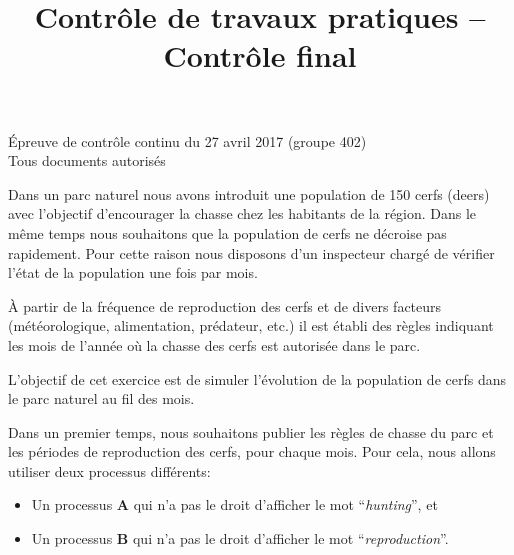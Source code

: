 \documentclass[CC,sansRappel,12pt]{tdtp-utf8}
\date{}
\title{Contrôle de travaux pratiques -- Contrôle final}
\begin{document}
\begin{feuille}

\hspace*{1mm} \hfill Épreuve de contrôle continu du 27 avril 2017 (groupe 402)\\
\hspace*{1mm} \hfill Tous documents autorisés\\[5mm]


\vspace{20pt}

Dans un parc naturel nous avons introduit une population de 150 cerfs (deers) avec l'objectif d'encourager la chasse chez les habitants de la région. Dans le même temps nous souhaitons que la population de cerfs ne décroise pas rapidement. Pour cette raison nous disposons d'un inspecteur chargé de vérifier l'état de la population une fois par mois.

À partir de la fréquence de reproduction des cerfs et de divers facteurs (météorologique, alimentation, prédateur, etc.) il est établi des règles indiquant les mois de l'année où la chasse des cerfs est autorisée dans le parc.

L'objectif de cet exercice est de simuler l'évolution de la population de cerfs dans le parc naturel au fil des mois.

\begin{exercice}

Dans un premier temps, nous souhaitons publier les règles de chasse du parc et les périodes de reproduction des cerfs, pour chaque mois. Pour cela, nous allons utiliser deux processus différents:

\begin{itemize}
\item Un processus \textbf{A} qui n'a pas le droit d'afficher le mot ``\textit{hunting}'', et
\item Un processus \textbf{B} qui n'a pas le droit d'afficher le mot ``\textit{reproduction}''.
\end{itemize}


\end{exercice}
\end{feuille}
\end{document}
